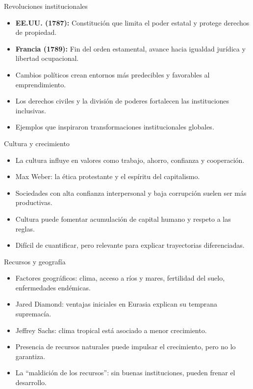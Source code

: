 \documentclass{beamer}
\begin{document}
\begin{frame}{Revoluciones institucionales}
    \begin{itemize}
        \item \textbf{EE.UU. (1787):} Constitución que limita el poder estatal y protege derechos de propiedad.
        \item \textbf{Francia (1789):} Fin del orden estamental, avance hacia igualdad jurídica y libertad ocupacional.
        \item Cambios políticos crean entornos más predecibles y favorables al emprendimiento.
        \item Los derechos civiles y la división de poderes fortalecen las instituciones inclusivas.
        \item Ejemplos que inspiraron transformaciones institucionales globales.
    \end{itemize}
\end{frame}

\begin{frame}{Cultura y crecimiento}
    \begin{itemize}
        \item La cultura influye en valores como trabajo, ahorro, confianza y cooperación.
        \item Max Weber: la ética protestante y el espíritu del capitalismo.
        \item Sociedades con alta confianza interpersonal y baja corrupción suelen ser más productivas.
        \item Cultura puede fomentar acumulación de capital humano y respeto a las reglas.
        \item Difícil de cuantificar, pero relevante para explicar trayectorias diferenciadas.
    \end{itemize}
\end{frame}

\begin{frame}{Recursos y geografía}
    \begin{itemize}
        \item Factores geográficos: clima, acceso a ríos y mares, fertilidad del suelo, enfermedades endémicas.
        \item Jared Diamond: ventajas iniciales en Eurasia explican su temprana supremacía.
        \item Jeffrey Sachs: clima tropical está asociado a menor crecimiento.
        \item Presencia de recursos naturales puede impulsar el crecimiento, pero no lo garantiza.
        \item La “maldición de los recursos”: sin buenas instituciones, pueden frenar el desarrollo.
    \end{itemize}
\end{frame}
\end{document}
